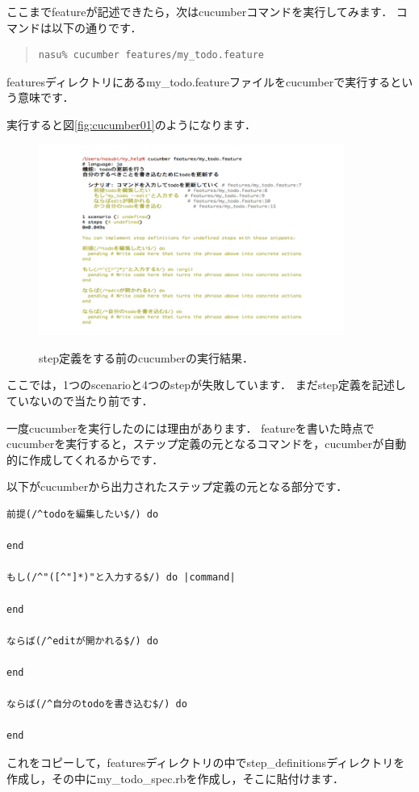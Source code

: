 ここまでfeatureが記述できたら，次はcucumberコマンドを実行してみます．
コマンドは以下の通りです．
\begin{quote}\begin{verbatim}
nasu% cucumber features/my_todo.feature
\end{verbatim}\end{quote}
featuresディレクトリにあるmy\_todo.featureファイルをcucumberで実行するという意味です．

実行すると図\ref{fig:cucumber01}のようになります．

\begin{figure}[htbp]\begin{center}
\includegraphics[width=10cm,bb= 0 0 737 553]{../figs/./cucumber01.001.jpg}
\caption{step定義をする前のcucumberの実行結果．}
\label{fig:cucumber01}
\label{default}\end{center}\end{figure}
ここでは，1つのscenarioと4つのstepが失敗しています．
まだstep定義を記述していないので当たり前です．

一度cucumberを実行したのには理由があります．
featureを書いた時点でcucumberを実行すると，ステップ定義の元となるコマンドを，cucumberが自動的に作成してくれるからです．

以下がcucumberから出力されたステップ定義の元となる部分です．
\begin{lstlisting}[style=customCsh,basicstyle={\scriptsize\ttfamily}]
前提(/^todoを編集したい$/) do

end

もし(/^"([^"]*)"と入力する$/) do |command|

end

ならば(/^editが開かれる$/) do
  
end

ならば(/^自分のtodoを書き込む$/) do

end
\end{lstlisting}
これをコピーして，featuresディレクトリの中でstep\_definitionsディレクトリを作成し，その中にmy\_todo\_spec.rbを作成し，そこに貼付けます．


